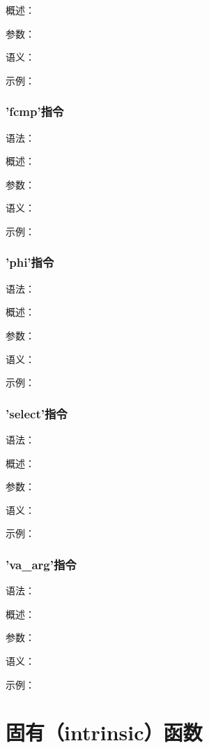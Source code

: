 \documentclass[12pt,a4paper]{article}
\begin{document}
{概述：

参数：

语义：

示例：


\subsubsection{'fcmp'指令} %

语法：

概述：

参数：

语义：

示例：


\subsubsection{'phi'指令} %

语法：

概述：

参数：

语义：

示例：


\subsubsection{'select'指令} %

语法：

概述：

参数：

语义：

示例：


\subsubsection{'va\_arg'指令} %

语法：

概述：

参数：

语义：

示例：



\section{固有（intrinsic）函数}

}
\end{document}
